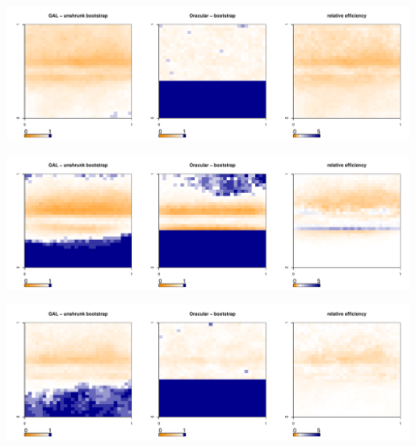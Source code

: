 	\begin{center}
		\includegraphics[width=0.99\textwidth]{../../figures/X1-28-15.pdf}
		\label{fig:coveragemap15}
	\end{center}
	
	\begin{center}
		\includegraphics[width=0.99\textwidth]{../../figures/X1-28-16.pdf}
		\label{fig:coveragemap16}
	\end{center}
        
	\begin{center}
		\includegraphics[width=0.99\textwidth]{../../figures/X1-28-17.pdf}
		\label{fig:coveragemap17}
	\end{center}
	
